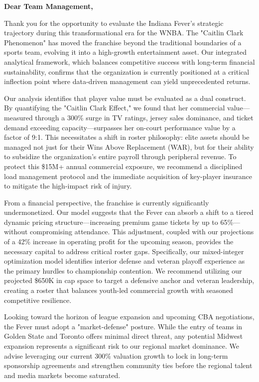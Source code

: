 \documentclass{mcmthesis}
\begin{document}
\newpage  %
\begin{letter}{\textbf{Dear Team Management,}}

\vspace{0.5cm}

Thank you for the opportunity to evaluate the Indiana Fever’s strategic trajectory during this transformational era for the WNBA. The "Caitlin Clark Phenomenon" has moved the franchise beyond the traditional boundaries of a sports team, evolving it into a high-growth entertainment asset. Our integrated analytical framework, which balances competitive success with long-term financial sustainability, confirms that the organization is currently positioned at a critical inflection point where data-driven management can yield unprecedented returns.

Our analysis identifies that player value must be evaluated as a dual construct. By quantifying the "Caitlin Clark Effect," we found that her commercial value---measured through a 300\% surge in TV ratings, jersey sales dominance, and ticket demand exceeding capacity---surpasses her on-court performance value by a factor of 9:1. This necessitates a shift in roster philosophy: elite assets should be managed not just for their Wins Above Replacement (WAR), but for their ability to subsidize the organization's entire payroll through peripheral revenue. To protect this \$15M+ annual commercial exposure, we recommend a disciplined load management protocol and the immediate acquisition of key-player insurance to mitigate the high-impact risk of injury.

From a financial perspective, the franchise is currently significantly undermonetized. Our model suggests that the Fever can absorb a shift to a tiered dynamic pricing structure---increasing premium game tickets by up to 65\%---without compromising attendance. This adjustment, coupled with our projections of a 42\% increase in operating profit for the upcoming season, provides the necessary capital to address critical roster gaps. Specifically, our mixed-integer optimization model identifies interior defense and veteran playoff experience as the primary hurdles to championship contention. We recommend utilizing our projected \$650K in cap space to target a defensive anchor and veteran leadership, creating a roster that balances youth-led commercial growth with seasoned competitive resilience.

Looking toward the horizon of league expansion and upcoming CBA negotiations, the Fever must adopt a "market-defense" posture. While the entry of teams in Golden State and Toronto offers minimal direct threat, any potential Midwest expansion represents a significant risk to our regional market dominance. We advise leveraging our current 300\% valuation growth to lock in long-term sponsorship agreements and strengthen community ties before the regional talent and media markets become saturated.


\end{letter}
\end{document}
